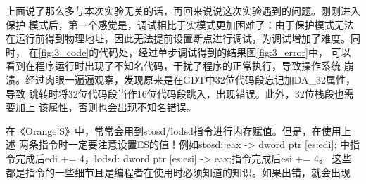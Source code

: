 \documentclass[12pt,a4paper,UTF8]{ctexart}
\begin{document}
上面说了那么多与本次实验无关的话，再回来说说这次实验遇到的问题。刚刚进入保护
模式后，第一个感觉是，调试相比于实模式更加困难了：由于保护模式无法
在运行前得到物理地址，因此无法提前设置断点进行调试，为调试增加了难度。同时，
在\ref{fig:3_code}的代码处，经过单步调试得到的结果图\ref{fig:3_error}中，
可以看到在程序运行时出现了不知名代码，干扰了程序的正常执行，导致操作系统
崩溃。经过肉眼一遍遍观察，发现原来是在GDT中32位代码段忘记加DA_32属性，导致
跳转时将32位代码段当作16位代码段跳入，出现错误。此外，32位栈段也需要加上
该属性，否则也会出现不知名错误。

\begin{figure}[htbp]
\centering
{}
\end{figure}

在《Orange'S》中，常常会用到stosd/lodsd指令进行内存赋值。但是，在使用上述
两条指令时一定要注意设置ES的值！例如stosd: eax -> dword  ptr [es:edi];
中指令完成后edi += 4，lodsd: dword ptr [es:esi] -> eax;指令完成后esi += 4。
这些都是指令的一些细节且是编程者在使用时必须知道的知识。如果出错，就会出现
\end{document}
